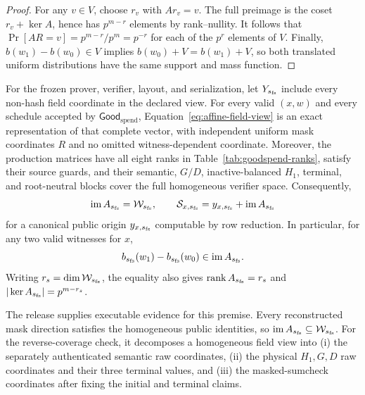 \begin{proof}
For any \(v\in V\), choose \(r_v\) with \(Ar_v=v\).  The full preimage is
the coset \(r_v+\ker A\), hence has \(p^{m-r}\) elements by rank--nullity.
It follows that
\(
 \Pr[AR=v]=p^{m-r}/p^m=p^{-r}
\)
for each of the \(p^r\) elements of \(V\).  Finally,
\(b(w_1)-b(w_0)\in V\) implies
\(b(w_0)+V=b(w_1)+V\), so both translated uniform distributions have the
same support and mass function.
\end{proof}

\begin{assumption}
\label{lem:complete-affine-image}
For the frozen \Profile{} prover, verifier, layout, and serialization, let
\(Y_{s_{\rm fs}}\) include every non-hash field coordinate in the declared
view.  For every valid \((x,w)\) and every schedule accepted by
\(\mathsf{Good}_{\mathrm{spend}}\), Equation~\eqref{eq:affine-field-view} is an exact
representation of that complete vector, with independent uniform mask
coordinates \(R\) and no omitted witness-dependent coordinate.  Moreover, the
production matrices have all eight ranks in Table~\ref{tab:goodspend-ranks},
satisfy their source guards, and their semantic, \(G/D\), inactive-balanced
\(H_1\), terminal, and root-neutral blocks cover the full homogeneous
verifier space.  Consequently,
\begin{equation}
 \operatorname{im}A_{s_{\rm fs}}=\mathcal W_{s_{\rm fs}},
 \qquad
 \mathcal S_{x,s_{\rm fs}}
 =y_{x,s_{\rm fs}}+\operatorname{im}A_{s_{\rm fs}}
 \label{eq:image-equality}
\end{equation}
for a canonical public origin \(y_{x,s_{\rm fs}}\) computable by row
reduction.  In particular, for any two valid witnesses for \(x\),
\[
b_{s_{\rm fs}}(w_1)-b_{s_{\rm fs}}(w_0)
   \in\operatorname{im}A_{s_{\rm fs}}.
\]
Writing \(r_s=\dim\mathcal W_{s_{\rm fs}}\), the equality also gives
\(\operatorname{rank}A_{s_{\rm fs}}=r_s\) and
\(|\ker A_{s_{\rm fs}}|=p^{m-r_s}\).
\end{assumption}

The release supplies executable evidence for this premise.  Every
reconstructed mask direction satisfies the homogeneous public identities, so
\(\operatorname{im}A_{s_{\rm fs}}\subseteq\mathcal W_{s_{\rm fs}}\).
For the reverse-coverage check, it decomposes a homogeneous field view into
(i) the separately authenticated semantic raw coordinates, (ii) the physical
\(H_1,G,D\) raw coordinates and their three terminal values, and (iii) the
masked-sumcheck coordinates after fixing the initial and terminal claims.

